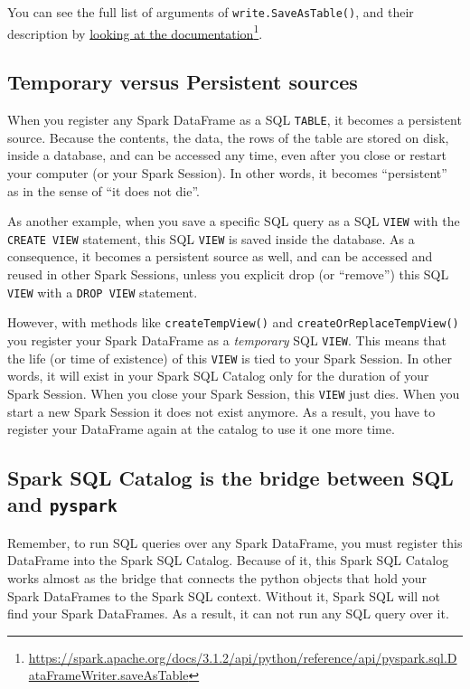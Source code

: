 \documentclass[
  11pt,
  letterpaper,
  DIV=11,
  numbers=noendperiod]{scrreprt}
\begin{document}
You can see the full list of arguments of \texttt{write.SaveAsTable()},
and their description by
\href{https://spark.apache.org/docs/3.1.2/api/python/reference/api/pyspark.sql.DataFrameWriter.saveAsTable}{looking
at the documentation}\footnote{\url{https://spark.apache.org/docs/3.1.2/api/python/reference/api/pyspark.sql.DataFrameWriter.saveAsTable}}.

\subsection{Temporary versus Persistent sources}\label{sec-temp-persist}

When you register any Spark DataFrame as a SQL \texttt{TABLE}, it
becomes a persistent source. Because the contents, the data, the rows of
the table are stored on disk, inside a database, and can be accessed any
time, even after you close or restart your computer (or your Spark
Session). In other words, it becomes ``persistent'' as in the sense of
``it does not die''.

As another example, when you save a specific SQL query as a SQL
\texttt{VIEW} with the \texttt{CREATE\ VIEW} statement, this SQL
\texttt{VIEW} is saved inside the database. As a consequence, it becomes
a persistent source as well, and can be accessed and reused in other
Spark Sessions, unless you explicit drop (or ``remove'') this SQL
\texttt{VIEW} with a \texttt{DROP\ VIEW} statement.

However, with methods like \texttt{createTempView()} and
\texttt{createOrReplaceTempView()} you register your Spark DataFrame as
a \emph{temporary} SQL \texttt{VIEW}. This means that the life (or time
of existence) of this \texttt{VIEW} is tied to your Spark Session. In
other words, it will exist in your Spark SQL Catalog only for the
duration of your Spark Session. When you close your Spark Session, this
\texttt{VIEW} just dies. When you start a new Spark Session it does not
exist anymore. As a result, you have to register your DataFrame again at
the catalog to use it one more time.

\subsection{\texorpdfstring{Spark SQL Catalog is the bridge between SQL
and
\texttt{pyspark}}{Spark SQL Catalog is the bridge between SQL and pyspark}}\label{spark-sql-catalog-is-the-bridge-between-sql-and-pyspark}

Remember, to run SQL queries over any Spark DataFrame, you must register
this DataFrame into the Spark SQL Catalog. Because of it, this Spark SQL
Catalog works almost as the bridge that connects the python objects that
hold your Spark DataFrames to the Spark SQL context. Without it, Spark
SQL will not find your Spark DataFrames. As a result, it can not run any
SQL query over it.
\end{document}
